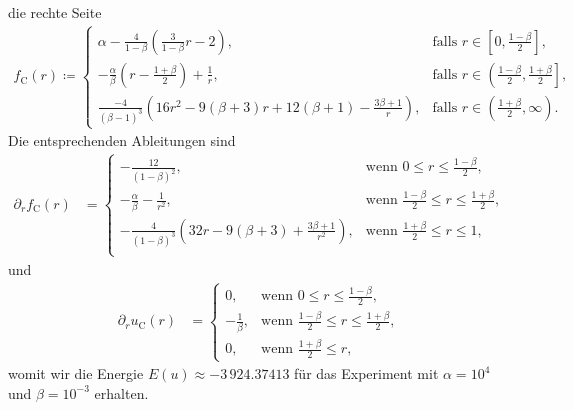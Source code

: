 die rechte Seite
\begin{align*}
  f_\textrm{C}(r)\coloneqq 
  \begin{cases}
    \alpha - \frac{4}{1-\beta}\left(\frac{3}{1-\beta}r - 2\right)\!, 
    & \text{falls } r\in \left[0,\frac{1-\beta}{2}\right]\!,\\
    -\frac{\alpha}{\beta}\left( r-\frac{1+\beta}{2} \right) +\frac{1}{r}, 
    & \text{falls } r\in \left(\frac{1-\beta}{2}, \frac{1+\beta}{2}\right]\!,\\
    \frac{-4}{(\beta-1)^3}
    \left( 16r^2 -9(\beta+3)r + 12(\beta+1) - \frac{3\beta+1}{r}\right)\!, 
    & \text{falls } r\in \left(\frac{1+\beta}{2},\infty\right)\!.
  \end{cases}
\end{align*}
Die entsprechenden Ableitungen sind
\begin{align*}
  \partial_r f_\textrm{C}(r) &= 
  \begin{cases}
    -\frac{12}{(1-\beta)^2},&\text{wenn }0\leq r\leq\frac{1-\beta}{2},\\
    -\frac{\alpha}{\beta}-\frac{1}{r^2},&
    \text{wenn } \frac{1-\beta}{2}\leq r\leq \frac{1+\beta}{2},\\
    -\frac{4}{(1-\beta)^3}\left( 32r-9(\beta+3)+\frac{3\beta+1}{r^2} \right)\!,&
    \text{wenn } \frac{1+\beta}{2}\leq r\leq 1,\\
  \end{cases}
\end{align*}
und
\begin{align*}
  \partial_r u_\textrm{C}(r) &= 
  \begin{cases}
    0,&\text{wenn }0\leq r\leq\frac{1-\beta}{2},\\
    -\frac{1}{\beta},&
    \text{wenn } \frac{1-\beta}{2}\leq r\leq \frac{1+\beta}{2},\\
    0,&\text{wenn } \frac{1+\beta}{2}\leq r,
  \end{cases}
\end{align*}
womit wir die Energie
$E(u)\approx -3\,924.37413$ für das Experiment mit $\alpha=10^4$ und $\beta =
10^{-3}$ erhalten.
